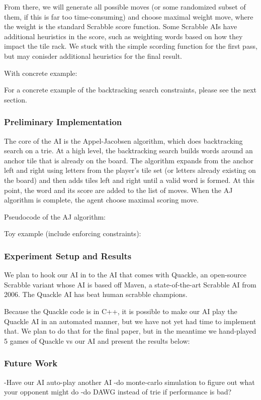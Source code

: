 \documentclass[12pt]{article}
\begin{document}
From there, we will generate all possible moves (or some randomized
subset of them, if this is far too time-consuming) and choose maximal
weight move, where the weight is the standard Scrabble score
function. Some Scrabble AIs have additional heuristics in the score,
such as weighting words based on how they impact the tile rack. We
stuck with the simple scording function for the first pass, but may
conisder additional heuristics for the final result.

With concrete example:

For a concrete example of the backtracking search constraints, please
see the next section.

\subsubsection*{Preliminary Implementation}
The core of the AI is the Appel-Jacobsen algorithm, which does
backtracking search on a trie. At a high level, the backtracking
search builds words around an anchor tile that is already on the
board. The algorithm expands from the anchor left and right using
letters from the player's tile set (or letters already existing on the
board) and then adds tiles left and right until a valid word is
formed. At this point, the word and its score are added to the
list of moves. When the AJ algorithm is complete, the agent choose maximal
scoring move.

Pseudocode of the AJ algorithm:


Toy example (include enforcing constraints):


\subsubsection*{Experiment Setup and Results}
We plan to hook our AI in to the AI that comes with Quackle, an
open-source Scrabble variant whose AI is based off Maven, a
state-of-the-art Scrabble AI from 2006. The Quackle AI has beat human
scrabble champions.

Because the Quackle code is in C++, it is possible to make our AI play
the Quackle AI in an automated manner, but we have not yet had time to
implement that. We plan to do that for the final paper, but in the
meantime we hand-played 5 games of Quackle vs our AI and present the
results below:

\subsubsection*{Future Work}
-Have our AI auto-play another AI
-do monte-carlo simulation to figure out what your opponent might do
-do DAWG instead of trie if performance is bad?
\end{document}
